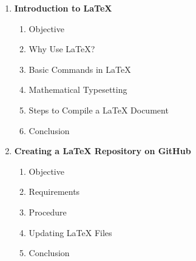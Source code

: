 \begin{enumerate}
    \item \textbf{Introduction to LaTeX}
    \begin{enumerate}
        \renewcommand{\labelenumii}{\arabic{enumi}.\arabic{enumii}}
        \item Objective
        \item Why Use LaTeX?
        \item Basic Commands in LaTeX
        \item Mathematical Typesetting
        \item Steps to Compile a LaTeX Document
        \item Conclusion
    \end{enumerate}

    \item \textbf{Creating a LaTeX Repository on GitHub}
    \begin{enumerate}
        \renewcommand{\labelenumii}{\arabic{enumi}.\arabic{enumii}}
        \item Objective
        \item Requirements
        \item Procedure
        \item Updating LaTeX Files
        \item Conclusion
    \end{enumerate}
\end{enumerate}
